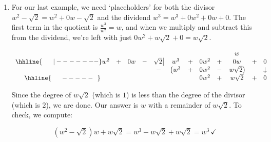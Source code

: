 {\begin{enumerate}
\item For our last example, we need `placeholders' for both the divisor  $w^2 - \sqrt{2} = w^2 + 0w -\sqrt{2}$ and the dividend $w^3 = w^3 + 0w^2 + 0w + 0$.  The first term in the quotient is $\frac{w^3}{w^2} = w$, and when we multiply and subtract this from the dividend, we're left with just $0w^2 + w\sqrt{2} + 0 = w\sqrt{2}$.

\setlength\arraycolsep{0.1pt}
\setlength\extrarowheight{2pt}

\[ \begin{array}{cccccccccccc}

    &   &    &   &                    &     &   &      &   &  w &   & \\ \hhline{~~~~~|-------}

w^2 & + & 0w & - & \sqrt{2} \, \vline & w^3 & + & 0w^2 & + & 0w & + & 0  \\
    
		&   &    &    &                  -&\left(w^3\vphantom{w\sqrt{2}} \right. & + & 0w^2 & - & \left.  w\sqrt{2} \right) & & \downarrow \\ \hhline{~~~~~-----~~}
    &   &    &    &                   &                                       &  &  0w^2     &  + &   w\sqrt{2}  & + & 0\\ 
 
\end{array}\]
\setlength\arraycolsep{5pt}
\setlength\extrarowheight{0pt}

Since the degree of $w\sqrt{2}$ (which is $1$) is less than the degree of the divisor (which is $2$), we are done.  Our answer is $w$ with a remainder of $w \sqrt{2}$.  To check, we compute:

\[ \left(w^2 - \sqrt{2}\right)w + w\sqrt{2} = w^3 - w\sqrt{2} + w\sqrt{2} = w^3 \, \checkmark\]

\end{enumerate}
}

